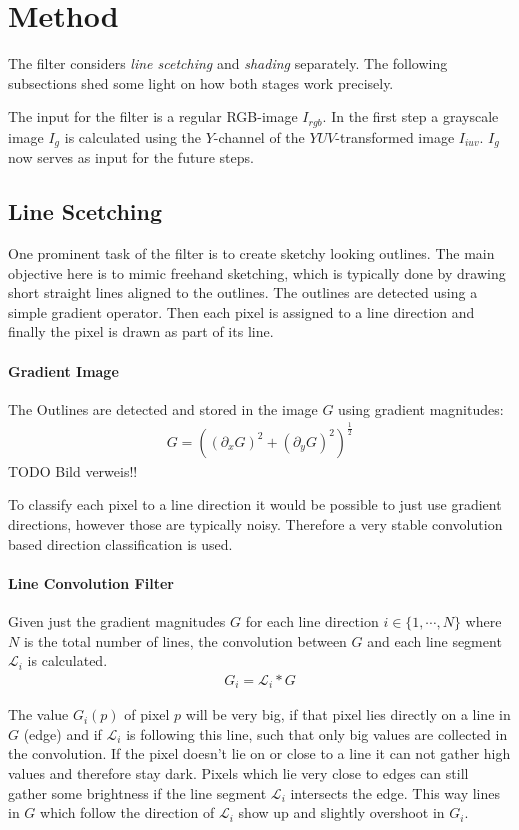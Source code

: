 \section{Method} \label{method}
The filter considers \textit{line scetching} and \textit{shading} separately.
The following subsections shed some light on how both stages work precisely.

The input for the filter is a regular RGB-image $I_{rgb}$. In the first step a
grayscale image $I_g$ is calculated using the $Y$-channel of the
$YUV$-transformed image $I_{iuv}$. $I_g$ now serves as input for the future
steps.

\subsection{Line Scetching}
One prominent task of the filter is to create sketchy looking outlines. The main
objective here is to mimic freehand sketching, which is typically done by
drawing short straight lines aligned to the outlines. The outlines are detected
using a simple gradient operator. Then each pixel is assigned to a line
direction and finally the pixel is drawn as part of its line.

\paragraph{Gradient Image}
The Outlines are detected and stored in the image $G$ using gradient magnitudes:
\begin{align*}
  G = ((\partial_x G)^2 + (\partial_y G)^2)^{\frac{1}{2}}
\end{align*}
TODO Bild verweis!!

To classify each pixel to a line direction it would be possible to just use
gradient directions, however those are typically noisy. Therefore a very stable
convolution based direction classification is used. 

\paragraph{Line Convolution Filter}
Given just the gradient magnitudes $G$ for each line direction $i \in
\lbrace 1,\cdots,N\rbrace$ where $N$ is the total number of lines, the convolution between
$G$ and each line segment $\mathscr{L}_i$ is calculated.
\begin{align*}
  G_i = \mathscr{L}_i * G
\end{align*}

The value $G_i(p)$ of pixel $p$ will be very big, if that pixel lies directly on
a line in $G$ (edge) and if $\mathscr{L}_i$ is following this line, such that only big
values are collected in the convolution. If the pixel doesn't lie on or close to
a line it can not gather high values and therefore stay dark. Pixels which lie
very close to edges can still gather some brightness if the
line segment $\mathscr{L}_i$ intersects the edge. This way lines in $G$ which
follow the direction of $\mathscr{L}_i$ show up and slightly overshoot in $G_i$.

